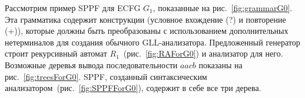 


Рассмотрим пример SPPF для ECFG $ G_1 $, показанные на рис.~\ref{fig:grammarG0}.
Эта грамматика содержит конструкции (условное вхождение (?) и повторение (+)),
которые должны быть преобразованы с использованием дополнительных нетерминалов 
для создания обычного GLL-анализатора.
Предложенный генератор строит рекурсивный автомат $ R_1 $~(рис.~\ref{fig:RAForG0})
и анализатор для него. Возможные деревья вывода последовательности $ aacb $ показаны 
на рис.~\ref{fig:treesForG0}. SPPF, созданный синтаксическим анализатором~(рис.~\ref{fig:SPPFForG0}),
содержит в себе все три дерева.

\begin{figure}[ht]   
	\centering
	~
	\subfloat[SPPF]{
}
\end{figure}
